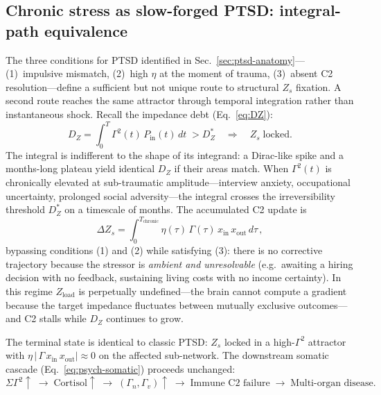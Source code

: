 \documentclass[aps,pre,twocolumn,superscriptaddress,floatfix]{revtex4-2}
\begin{document}
\subsection{Chronic stress as slow-forged PTSD:
  integral-path equivalence}
\label{sec:chronic-stress-ptsd}

The three conditions for PTSD identified in
Sec.~\ref{sec:ptsd-anatomy}---(1)~impulsive mismatch,
(2)~high $\eta$ at the moment of trauma,
(3)~absent C2 resolution---define a sufficient but
not unique route to structural $Z_s$ fixation.
A second route reaches the same attractor through
temporal integration rather than instantaneous shock.
Recall the impedance debt
(Eq.~\ref{eq:DZ}):
\begin{equation}
  D_Z = \int_0^T \Gamma^2(t)\,P_{\text{in}}(t)\,dt
  \;> D_Z^*
  \quad\Longrightarrow\quad
  Z_s \;\text{locked.}
  \label{eq:chronic-dz}
\end{equation}
The integral is indifferent to the shape of its
integrand: a Dirac-like spike and a months-long
plateau yield identical $D_Z$ if their areas match.
When $\Gamma^2(t)$ is chronically elevated at
sub-traumatic amplitude---interview anxiety,
occupational uncertainty, prolonged social
adversity---the integral crosses the irreversibility
threshold $D_Z^*$ on a timescale of months.
The accumulated C2 update is
\begin{equation}
  \Delta Z_s
    = \int_0^{T_{\text{chronic}}}
      \eta(\tau)\,\Gamma(\tau)\,
      x_{\text{in}}\,x_{\text{out}}\,d\tau\,,
  \label{eq:chronic-dz-update}
\end{equation}
bypassing conditions (1) and (2) while satisfying
(3): there is no corrective trajectory because the
stressor is \emph{ambient and unresolvable}
(e.g.\ awaiting a hiring decision with no feedback,
sustaining living costs with no income certainty).
In this regime $Z_{\text{load}}$ is perpetually
undefined---the brain cannot compute a gradient
because the target impedance fluctuates between
mutually exclusive outcomes---and C2 stalls while
$D_Z$ continues to grow.

The terminal state is identical to classic PTSD:
$Z_s$ locked in a high-$\Gamma^2$ attractor with
$\eta\,|\,\Gamma\,x_{\text{in}}\,x_{\text{out}}|\approx 0$
on the affected sub-network.
The downstream somatic cascade
(Eq.~\ref{eq:psych-somatic}) proceeds unchanged:
\[
  \Sigma\Gamma^2\!\uparrow
  \;\to\; \text{Cortisol}\!\uparrow
  \;\to\; (\Gamma_n,\Gamma_v)\!\uparrow
  \;\to\; \text{Immune C2 failure}
  \;\to\; \text{Multi-organ disease.}
\]
\end{document}
